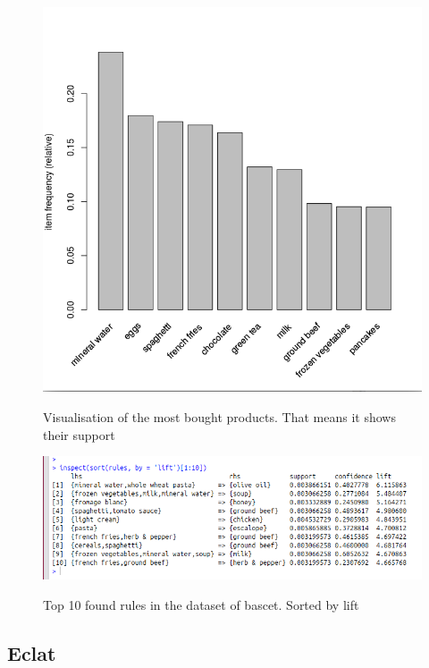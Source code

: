 \documentclass[runningheads,a4paper]{llncs}
\begin{document}
\begin{figure}[H]
\centering
\begin{center}
\includegraphics[scale=0.6]{pics/apriori_support}
\label{uloha1:pic1}
\caption{Visualisation of the most bought products. That means it shows their support} 
\end{center}
\end{figure}


\begin{figure}[H]
\centering
\begin{center}
\includegraphics[scale=0.6]{pics/apriori_result}
\label{uloha1:pic1}
\caption{Top 10 found rules in the dataset of bascet. Sorted by lift} 
\end{center}
\end{figure}

\subsection{Eclat}
\end{document}
